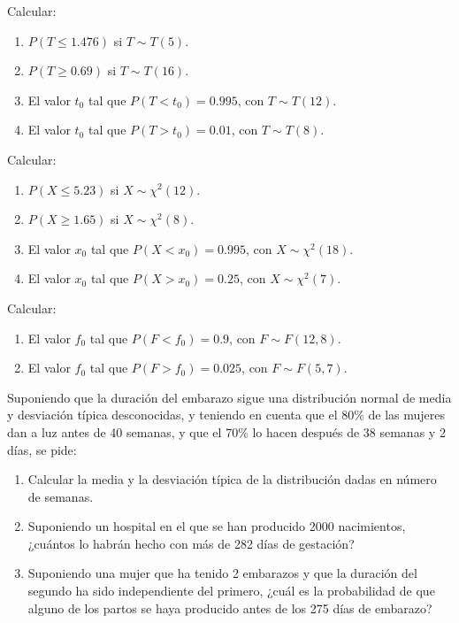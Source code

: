 {Calcular:
\begin{enumerate}
\item  $P(T\leq 1.476)$ si $T\sim T(5)$.
\item  $P(T\geq 0.69)$ si $T\sim T(16)$.
\item  El valor $t_{0}$ tal que $P(T<t_{0})=0.995$, con $T\sim T(12)$.
\item  El valor $t_{0}$ tal que $P(T>t_{0})=0.01$, con $T\sim T(8)$.
\end{enumerate}
}
{}
{}


{Calcular:

\begin{enumerate}
\item  $P(X\leq 5.23)$ si $X\sim \chi ^{2}(12)$.
\item  $P(X\geq 1.65)$ si $X\sim \chi ^{2}(8)$.
\item  El valor $x_{0}$ tal que $P(X<x_{0})=0.995$, con $X\sim \chi ^{2}(18)$.
\item  El valor $x_{0}$ tal que $P(X>x_{0})=0.25$, con $X\sim \chi ^{2}(7)$.
\end{enumerate}
}
{}
{}


{Calcular:

\begin{enumerate}
\item  El valor $f_{0}$ tal que $P(F<f_{0})=0.9$, con $F\sim F(12,8)$.
\item  El valor $f_{0}$ tal que $P(F>f_{0})=0.025$, con $F\sim F(5,7)$.
\end{enumerate}
}
{}
{}


{Suponiendo que la duración del embarazo sigue una distribución normal de media y desviación típica desconocidas, y
teniendo en cuenta que el 80\% de las mujeres dan a luz antes de 40 semanas, y que el 70\% lo hacen después de 38
semanas y 2 días, se pide:  

\begin{enumerate}
\item Calcular la media y la desviación típica de la distribución dadas en número de semanas.\\
\item Suponiendo un hospital en el que se han producido 2000 nacimientos, ¿cuántos lo habrán hecho con más de 282 días de gestación?
\item Suponiendo una mujer que ha tenido 2 embarazos y que la duración del segundo ha sido independiente del primero, ¿cuál es la probabilidad de que alguno de los partos se haya producido antes de los 275 días de embarazo?
\end{enumerate}
}
{}
{}



